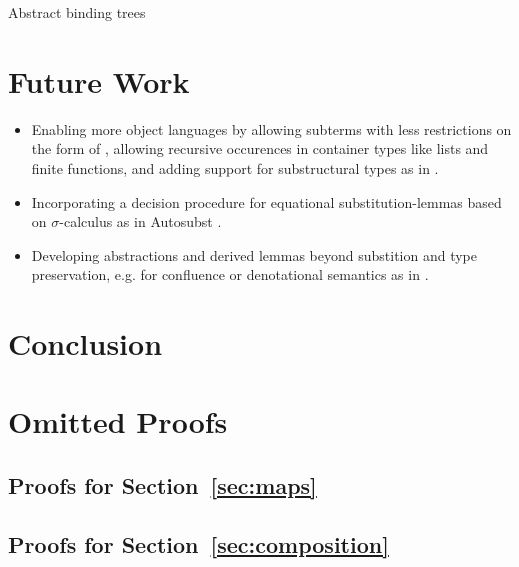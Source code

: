 \documentclass[sigplan,10pt, anonymous]{acmart}
\newenvironment{LibCode*}{%
  \begin{tcolorbox}[%
    colframe=white,%
    boxrule=0.0pt,%
    top=2.5pt,%
    left=2.5pt,%
    bottom=2.5pt,%
    right=2.5pt,%
    boxsep=0pt%
  ]\vspace{-0.2\baselineskip}%
}{%
  \vspace{-1\baselineskip}%
  \end{tcolorbox}%
}
\newcommand*\LibCode[1]{\begin{LibCode*}{#1}\end{LibCode*}}
\newcommand*\AppCode[1]{{#1}}
\newcommand*\ACode[1]{\AgdaFontStyle{\textcolor{mygray}{#1}}}
\begin{document}
  Abstract binding trees

  \section{Future Work}
  \label{sec:future}
  \begin{itemize}
  \item
    Enabling more object languages by allowing subterms with less
    restrictions on the form of \ACode{S}, allowing recursive
    occurences in container types like lists and finite functions, and
    adding support for substructural types as in
    \cite{DBLP:journals/corr/abs-2005-02247}.
  \item
    Incorporating a decision procedure for equational
    substitution-lemmas based on $\sigma$-calculus as in Autosubst
    \cite{DBLP:conf/itp/SchaferTS15, DBLP:conf/cpp/StarkSK19}.
  \item
    Developing abstractions and derived lemmas beyond substition and
    type preservation, e.g. for confluence or denotational semantics
    as in \cite{DBLP:journals/pacmpl/AllaisA0MM18}.
  \end{itemize}

  \section{Conclusion}
  \label{sec:conclusion}

  

  \clearpage
  \appendix
  \onecolumn

  \section{Omitted Proofs}
  \label{sec:proofs}

  \subsection{Proofs for Section~\ref{sec:maps}}
  \LibCode\KIdLift
  \LibCode\KIdLiftProof


  \subsection{Proofs for Section~\ref{sec:composition}}
  \LibCode\KComposeKitAp
  \LibCode\KComposeKitApProof
\end{document}

